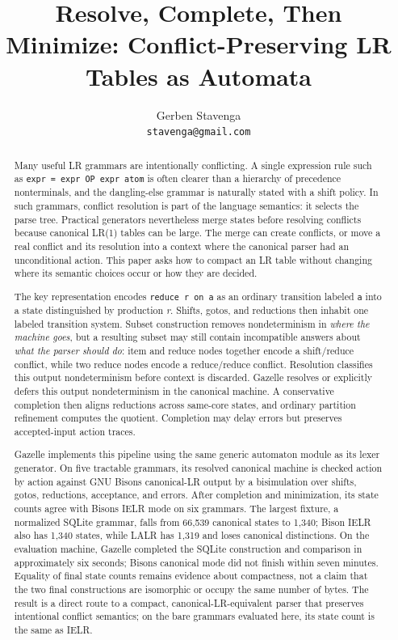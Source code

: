 \documentclass[
  10pt,
]{article}
\title{Resolve, Complete, Then Minimize: Conflict-Preserving LR Tables as Automata}
\author{Gerben Stavenga\\
\texttt{stavenga@gmail.com}}
\date{}
\begin{document}
\maketitle

\begin{abstract}

Many useful LR grammars are intentionally conflicting. A single
expression rule such as \texttt{expr = expr OP expr \textbar{} atom} is
often clearer than a hierarchy of precedence nonterminals, and the
dangling-else grammar is naturally stated with a shift policy. In such
grammars, conflict resolution is part of the language semantics: it
selects the parse tree. Practical generators nevertheless merge states
before resolving conflicts because canonical LR(1) tables can be large.
The merge can create conflicts, or move a real conflict and its
resolution into a context where the canonical parser had an
unconditional action. This paper asks how to compact an LR table without
changing where its semantic choices occur or how they are decided.

The key representation encodes \texttt{reduce\ r\ on\ a} as an ordinary
transition labeled \texttt{a} into a state distinguished by production
\emph{r}. Shifts, gotos, and reductions then inhabit one labeled
transition system. Subset construction removes nondeterminism in
\emph{where the machine goes}, but a resulting subset may still contain
incompatible answers about \emph{what the parser should do}: item and
reduce nodes together encode a shift/reduce conflict, while two reduce
nodes encode a reduce/reduce conflict. Resolution classifies this output
nondeterminism before context is discarded. Gazelle resolves or
explicitly defers this output nondeterminism in the canonical machine. A
conservative completion then aligns reductions across same-core states,
and ordinary partition refinement computes the quotient. Completion may
delay errors but preserves accepted-input action traces.

Gazelle implements this pipeline using the same generic automaton module
as its lexer generator. On five tractable grammars, its resolved
canonical machine is checked action by action against GNU
Bison\textquotesingle s canonical-LR output by a bisimulation over
shifts, gotos, reductions, acceptance, and errors. After completion and
minimization, its state counts agree with Bison\textquotesingle s IELR
mode on six grammars. The largest fixture, a normalized SQLite grammar,
falls from 66,539 canonical states to 1,340; Bison IELR also has 1,340
states, while LALR has 1,319 and loses canonical distinctions. On the
evaluation machine, Gazelle completed the SQLite construction and
comparison in approximately six seconds; Bison\textquotesingle s
canonical mode did not finish within seven minutes. Equality of final
state counts remains evidence about compactness, not a claim that the
two final constructions are isomorphic or occupy the same number of
bytes. The result is a direct route to a compact,
canonical-LR-equivalent parser that preserves intentional conflict
semantics; on the bare grammars evaluated here, its state count is the
same as IELR.

\end{abstract}
\end{document}
